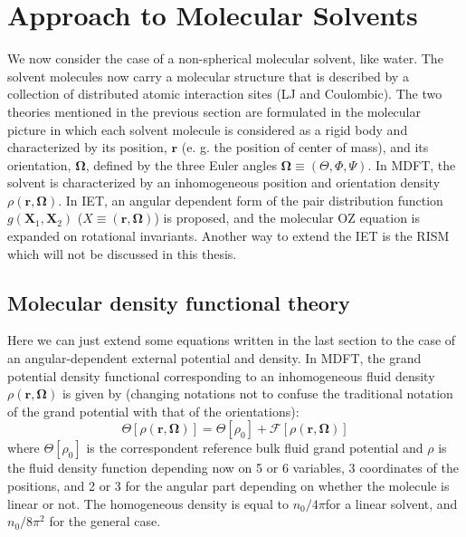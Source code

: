 
\chapter{Approach to Molecular Solvents\label{chpt:iem-mdft}}

We now consider the case of a non-spherical molecular solvent, like
water. The solvent molecules now carry a molecular structure that
is described by a collection of distributed atomic interaction sites
(LJ and Coulombic). The two theories mentioned in the previous section
are formulated in the molecular picture in which each solvent molecule
is considered as a rigid body and characterized by its position, $\mathbf{r}$
(e. g. the position of center of mass), and its orientation, $\mathbf{\Omega}$,
defined by the three Euler angles $\mathbf{\Omega}\equiv(\Theta,\Phi,\Psi)$.
In \acs{MDFT}, the solvent is characterized by an inhomogeneous position
and orientation density $\rho(\mathbf{r},\mathbf{\Omega})$. In \acs{IET},
an angular dependent form of the pair distribution function $g(\mathbf{X}_{1},\mathbf{X}_{2})$
($X\equiv(\mathbf{r},\mathbf{\Omega})$) is proposed, and the molecular
\acs{OZ} equation is expanded on rotational invariants. Another way
to extend the IET is the RISM \citep{hirata_molecular_2004} which
will not be discussed in this thesis.

\section{Molecular density functional theory}

Here we can just extend some equations written in the last section
to the case of an angular-dependent external potential and density.
In \acf{MDFT}, the grand potential density functional corresponding
to an inhomogeneous fluid density $\rho(\mathbf{r},\mathbf{\Omega})$
is given by (changing notations not to confuse the traditional notation
of the grand potential with that of the orientations):
\begin{equation}
\Theta[\rho(\mathbf{r},\mathbf{\Omega})]=\Theta[\rho_{0}]+\mathcal{F}[\rho(\mathbf{r},\mathbf{\Omega})]
\end{equation}
where $\Theta[\rho_{0}]$ is the correspondent reference bulk fluid
grand potential and $\rho$ is the fluid density function depending
now on 5 or 6 variables, 3 coordinates of the positions, and 2 or
3 for the angular part depending on whether the molecule is linear or not.
The homogeneous density is equal to $n_{0}/4\pi$for a linear solvent, and
$n_{0}/8\pi^{2}$ for the general case.


